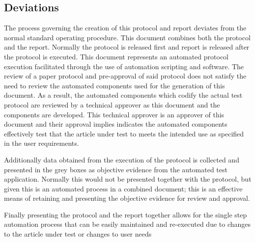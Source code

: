 \subsection{Deviations}
The process governing the creation of this protocol and report deviates from the
normal standard operating procedure.  This document combines both the protocol
and the report.  Normally the protocol is released first and report is released
after the protocol is executed.  This document represents an automated protocol
execution facilitated through the use of automation scripting and software.  The
review of a paper protocol and pre-approval of said protocol does not satisfy
the need to review the automated components used for the generation of this
document.  As a result, the automated components which codify the actual test
protocol are reviewed by a technical approver as this document and the
components are developed.  This technical approver is an approver of this
document and their approval implies indicates the automated components
effectively test that the article under test to meets the intended use as
specified in the user requirements.  

Additionally data obtained from the execution of the protocol is collected and
presented in the grey boxes as objective evidence from the automated test
application.  Normally this would not be presented together with the protocol,
but given this is an automated process in a combined document; this is an
effective means of retaining and presenting the objective evidence for review
and approval.

Finally presenting the protocol and the report together allows for the single
step automation process that can be easily maintained and re-executed due to
changes to the article under test or changes to user needs
